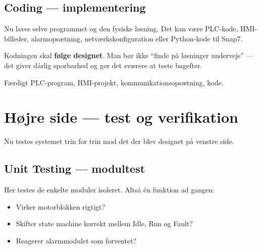 \documentclass[12pt, a4paper]{article}
\begin{document}
\subsection{Coding --- implementering}

Nu laves selve programmet og den fysiske løsning.
Det kan være PLC-kode, HMI-billeder, alarmopsætning, netværkskonfiguration eller Python-kode til Snap7.

\begin{tcolorbox}[warnbox, title={\faExclamationTriangle\quad Vigtigt}]
Kodningen skal \textbf{følge designet}. Man bør ikke ``finde på løsninger undervejs'' --- det giver dårlig sporbarhed og gør det sværere at teste bagefter.
\end{tcolorbox}

\begin{tcolorbox}[tipbox, title={\faCheckSquare\quad Output fra fasen}]
Færdigt PLC-program, HMI-projekt, kommunikationsopsætning, kode.
\end{tcolorbox}

\section{Højre side --- test og verifikation}

Nu testes systemet trin for trin mod det der blev designet på venstre side.

\subsection{Unit Testing --- modultest}

Her testes de enkelte moduler isoleret. Altså én funktion ad gangen:

\begin{itemize}[leftmargin=1.5em, itemsep=2pt]
  \item Virker motorblokken rigtigt?
  \item Skifter state machine korrekt mellem Idle, Run og Fault?
  \item Reagerer alarmmodulet som forventet?
\end{itemize}
\end{document}
